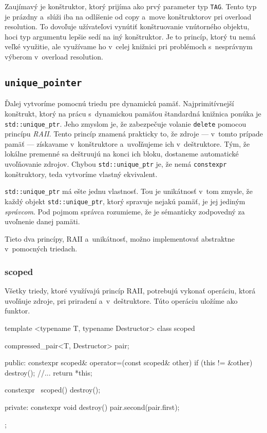 Zaujímavý je konštruktor, ktorý prijíma ako prvý parameter typ \texttt{TAG}. Tento typ je prázdny a~slúži iba na odlíšenie od copy a~move konštruktorov pri overload resolution. To dovoľuje užívateľovi vynútiť konštruovanie vnútorného objektu, hoci typ argumentu lepšie sedí na iný konštruktor. Je to princíp, ktorý tu nemá veľké využitie, ale využívame ho v~celej knižnici pri problémoch s~nesprávnym výberom v~overload resolution.

\subsection{\texttt{unique\_pointer}}

Ďalej vytvoríme pomocnú triedu pre dynamickú pamäť. Najprimitívnejší konštrukt, ktorý na prácu s~dynamickou pamäťou štandardná knižnica ponúka je \texttt{std::unique\_ptr}. Jeho zmyslom je, že zabezpečuje volanie \texttt{delete} pomocou princípu \emph{RAII}. Tento princíp znamená prakticky to, že zdroje --- v~tomto prípade pamäť --- získavame v~konštruktore a~uvoľňujeme ich v~deštruktore. Tým, že lokálne premenné sa deštruujú na konci ich bloku, dostaneme automatické uvoľňovanie zdrojov. Chybou \texttt{std::unique\_ptr} je, že nemá \texttt{constexpr} konštruktory, teda vytvoríme vlastný ekvivalent.

\texttt{std::unique\_ptr} má ešte jednu vlastnosť. Tou je unikátnosť v~tom zmysle, že každý objekt \texttt{std::unique\_ptr}, ktorý spravuje nejakú pamäť, je jej jediným \emph{správcom}. Pod pojmom správca rozumieme, že je sémanticky zodpovedný za uvoľnenie danej pamäti.

Tieto dva princípy, RAII a~unikátnosť, možno implementovať abstraktne v~pomocných triedach.

\subsubsection{scoped}

Všetky triedy, ktoré využívajú princíp RAII, potrebujú vykonať operáciu, ktorá uvoľňuje zdroje, pri priradení a~v~deštruktore. Túto operáciu uložíme ako funktor.
\begin{code}[fontsize=\footnotesize]
template <typename T, typename Destructor>
class scoped
{   compressed_pair<T, Destructor> pair;

public:
    constexpr scoped& operator=(const scoped& other)
    {   if (this != &other) { destroy(); //... }
        return *this; }
        
    constexpr ~scoped() { destroy(); }
	
private:
    constexpr void destroy() { pair.second(pair.first); } };
\end{code}

